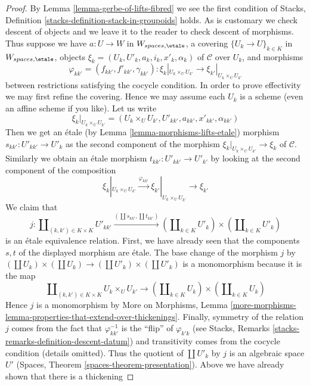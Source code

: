 \begin{proof}
By Lemma \ref{lemma-gerbe-of-lifts-fibred} we see the first condition
of Stacks, Definition \ref{stacks-definition-stack-in-groupoids} holds.
As is customary we check descent of objects and we leave it to the reader
to check descent of morphisms. Thus suppose we have $a : U \to W$
in $W_{spaces, \etale}$, a covering $\{U_k \to U\}_{k \in K}$ in
$W_{spaces, \etale}$, objects $\xi_k = (U_k, U'_k, a_k, i_k, x'_k, \alpha_k)$
of $\mathcal{C}$ over $U_k$, and morphisms
$$
\varphi_{kk'} = (f_{kk'}, f'_{kk'}, \gamma_{kk'}) :
\xi_k|_{U_k \times_U U_{k'}} \to
\xi_{k'}|_{U_k \times_U U_{k'}}
$$
between restrictions satisfying the cocycle condition. In order to prove
effectivity we may first refine the covering. Hence we may assume each
$U_k$ is a scheme (even an affine scheme if you like). Let us write
$$
\xi_k|_{U_k \times_U U_{k'}} =
(U_k \times_U U_{k'}, U'_{kk'}, a_{kk'}, x'_{kk'}, \alpha_{kk'})
$$
Then we get an \'etale (by Lemma \ref{lemma-morphisms-lifts-etale}) morphism
$s_{kk'} : U'_{kk'} \to U'_k$
as the second component of the morphism
$\xi_k|_{U_k \times_U U_{k'}} \to \xi_k$ of $\mathcal{C}$.
Similarly we obtain an \'etale morphism $t_{kk'} : U'_{kk'} \to U'_{k'}$
by looking at the second component of the composition
$$
\xi_k|_{U_k \times_U U_{k'}} \xrightarrow{\varphi_{kk'}}
\xi_{k'}|_{U_k \times_U U_{k'}} \to \xi_{k'}
$$
We claim that
$$
j :
\coprod\nolimits_{(k, k') \in K \times K} U'_{kk'}
\xrightarrow{(\coprod s_{kk'}, \coprod t_{kk'})}
(\coprod\nolimits_{k \in K} U'_k) \times (\coprod\nolimits_{k \in K} U'_k)
$$
is an \'etale equivalence relation. First, we have already seen
that the components $s, t$ of the displayed morphism are \'etale.
The base change of the morphism $j$ by
$(\coprod U_k) \times (\coprod U_k) \to (\coprod U'_k) \times (\coprod U'_k)$
is a monomorphism because it is the map
$$
\coprod\nolimits_{(k, k') \in K \times K} U_k \times_U U_{k'}
\longrightarrow
(\coprod\nolimits_{k \in K} U_k) \times (\coprod\nolimits_{k \in K} U_k)
$$
Hence $j$ is a monomorphism by More on Morphisms, Lemma
\ref{more-morphisms-lemma-properties-that-extend-over-thickenings}.
Finally, symmetry of the relation $j$ comes from the fact that
$\varphi_{kk'}^{-1}$ is the ``flip'' of $\varphi_{k'k}$ (see
Stacks, Remarks \ref{stacks-remarks-definition-descent-datum})
and transitivity comes from the cocycle condition (details omitted).
Thus the quotient of $\coprod U'_k$ by $j$ is an algebraic space $U'$
(Spaces, Theorem \ref{spaces-theorem-presentation}).
Above we have already shown that there is a thickening

\end{proof}
